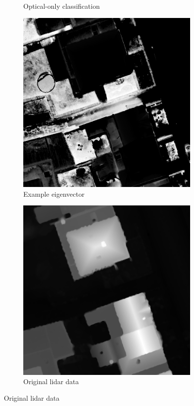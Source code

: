 \documentclass{article}[11pt]
\begin{document}
\begin{figure}[htb]
\begin{subfigure}{.33\textwidth}
  \caption{Optical-only classification}
  \label{fig:opticalOnly}
\end{subfigure}
\begin{subfigure}{.33\textwidth}
  \centering
  \includegraphics[width=.8\linewidth]{./Images/DFC2015/evec2.png}
  \caption{Example eigenvector}
  \label{fig:evec}
\end{subfigure}
\begin{subfigure}{.33\textwidth}
  \centering
  \includegraphics[width=.8\linewidth]{./Images/DFC2015/lidar.png}
  \caption{Original lidar data}
  \label{fig:lidar}
\end{subfigure}

\end{figure}
\end{document}
